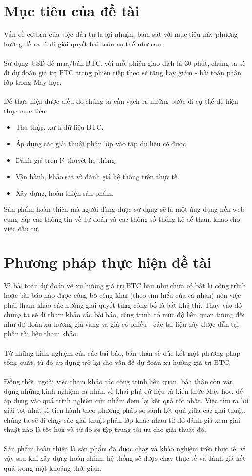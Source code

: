 \section{Mục tiêu của đề tài}
Vấn đề cơ bản của việc đầu tư là lợi nhuận, bám sát với mục tiêu này phương hướng 
đề ra sẽ đi giải quyết bài toán cụ thể như sau.\\\\
Sử dụng USD để mua/bán BTC, với mỗi phiên giao dịch là 30 phút, chúng 
ta sẽ đi dự đoán giá trị BTC trong phiên tiếp theo sẽ tăng hay giảm - bài
toán phân lớp trong Máy học.\\\\
Để thực hiện được điều đó chúng ta cần vạch ra những bước đi cụ
thể để hiện thực mục tiêu:
\begin{itemize}
  \item Thu thập, xử lí dữ liệu BTC.
  \item Áp dụng các giải thuật phân lớp vào tập dữ liệu có được.
  \item Đánh giá trên lý thuyết hệ thống.
  \item Vận hành, khảo sát và đánh giá hệ thống trên thực tế.
  \item Xây dựng, hoàn thiện sản phẩm.
\end{itemize} 
Sản phẩm hoàn thiện mà người dùng được sử dụng sẽ là một ứng dụng nền web cung 
cấp các thông tin về dự đoán và các thông số thống kê để tham khảo cho việc 
đầu tư.
\section{Phương pháp thực hiện đề tài}
Vì bài toán dự đoán về xu hướng giá trị BTC hầu như chưa có bất kì 
công trình hoặc bài báo nào được công bố công khai (theo tìm hiểu của cá nhân) 
nên việc phải tham khảo các hướng giải quyết từng công bố là bất khả thi. Thay 
vào đó chúng ta sẽ đi tham khảo các bài báo, công trình có mức độ liên quan 
tương đối như dự đoán xu hướng giá vàng và giá cổ phiếu - các tài liệu này được 
dẫn tại phần tài liệu tham khảo.\\\\
Từ những kinh nghiệm của các bài báo, bản thân sẽ đúc kết một phương pháp tổng 
quát, từ đó áp dụng trở lại cho vấn đề dự đoán xu hướng giá trị BTC.\\\\
Đồng thời, ngoài việc tham khảo các công trình liên quan, bản thân còn vận dụng 
những kinh nghiệm cá nhân về khai phá dữ liệu và kiến thức Máy học, để áp dụng 
vào quá trình nghiên cứu nhằm đem lại kết quả tốt nhất. Việc tìm ra lời giải 
tốt nhất sẽ tiến hành theo phương pháp so sánh kết quả giữa các giải thuật, 
chúng ta sẽ đi chạy các giải thuật phân lớp khác nhau từ đó đánh giá xem giải 
thuật nào là tốt hơn và từ đó sẽ tập trung tối ưu cho giải thuật đó.\\\\
Sản phẩm hoàn thiện là sản phẩm đã được chạy và khảo nghiệm trên thực tế, vì vậy 
sau khi xây dựng hoàn chỉnh, hệ thống sẽ được chạy thực tế và đánh giá kết quả 
trong một khoảng thời gian.
